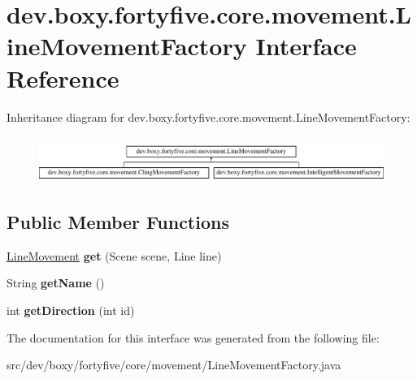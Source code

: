 \hypertarget{interfacedev_1_1boxy_1_1fortyfive_1_1core_1_1movement_1_1_line_movement_factory}{
\section{dev.boxy.fortyfive.core.movement.LineMovementFactory Interface Reference}
\label{d0/d48/interfacedev_1_1boxy_1_1fortyfive_1_1core_1_1movement_1_1_line_movement_factory}
}
Inheritance diagram for dev.boxy.fortyfive.core.movement.LineMovementFactory:\begin{figure}[H]
\begin{center}
\leavevmode
\includegraphics[height=1.505376cm]{d0/d48/interfacedev_1_1boxy_1_1fortyfive_1_1core_1_1movement_1_1_line_movement_factory}
\end{center}
\end{figure}
\subsection*{Public Member Functions}
\begin{DoxyCompactItemize}
\item 
\hypertarget{interfacedev_1_1boxy_1_1fortyfive_1_1core_1_1movement_1_1_line_movement_factory_ae8ec9beb5bac8692522cd31f01a3844f}{
\hyperlink{classdev_1_1boxy_1_1fortyfive_1_1core_1_1movement_1_1_line_movement}{LineMovement} {\bfseries get} (Scene scene, Line line)}
\label{d0/d48/interfacedev_1_1boxy_1_1fortyfive_1_1core_1_1movement_1_1_line_movement_factory_ae8ec9beb5bac8692522cd31f01a3844f}

\item 
\hypertarget{interfacedev_1_1boxy_1_1fortyfive_1_1core_1_1movement_1_1_line_movement_factory_a3582d1beb3d1db11ba6982b117254d1c}{
String {\bfseries getName} ()}
\label{d0/d48/interfacedev_1_1boxy_1_1fortyfive_1_1core_1_1movement_1_1_line_movement_factory_a3582d1beb3d1db11ba6982b117254d1c}

\item 
\hypertarget{interfacedev_1_1boxy_1_1fortyfive_1_1core_1_1movement_1_1_line_movement_factory_a56081af7866666406e4e535b7b1e537a}{
int {\bfseries getDirection} (int id)}
\label{d0/d48/interfacedev_1_1boxy_1_1fortyfive_1_1core_1_1movement_1_1_line_movement_factory_a56081af7866666406e4e535b7b1e537a}

\end{DoxyCompactItemize}


The documentation for this interface was generated from the following file:\begin{DoxyCompactItemize}
\item 
src/dev/boxy/fortyfive/core/movement/LineMovementFactory.java\end{DoxyCompactItemize}
